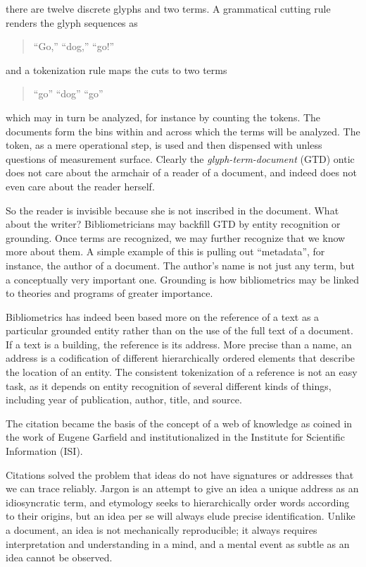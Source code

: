\documentclass[]{book}
\theoremstyle{definition}
\theoremstyle{definition}
\theoremstyle{definition}
\theoremstyle{remark}
\begin{document}
there are twelve discrete glyphs and two terms. A grammatical cutting
rule renders the glyph sequences as

\begin{quote}
``Go,'' ``dog,'' ``go!''
\end{quote}

and a tokenization rule maps the cuts to two terms

\begin{quote}
``go'' ``dog'' ``go''
\end{quote}

which may in turn be analyzed, for instance by counting the tokens. The
documents form the bins within and across which the terms will be
analyzed. The token, as a mere operational step, is used and then
dispensed with unless questions of measurement surface. Clearly the
\emph{glyph-term-document} (GTD) ontic does not care about the armchair
of a reader of a document, and indeed does not even care about the
reader herself.

So the reader is invisible because she is not inscribed in the document.
What about the writer? Bibliometricians may backfill GTD by entity
recognition or grounding. Once terms are recognized, we may further
recognize that we know more about them. A simple example of this is
pulling out ``metadata'', for instance, the author of a document. The
author's name is not just any term, but a conceptually very important
one. Grounding is how bibliometrics may be linked to theories and
programs of greater importance.

Bibliometrics has indeed been based more on the reference of a text as a
particular grounded entity rather than on the use of the full text of a
document. If a text is a building, the reference is its address. More
precise than a name, an address is a codification of different
hierarchically ordered elements that describe the location of an entity.
The consistent tokenization of a reference is not an easy task, as it
depends on entity recognition of several different kinds of things,
including year of publication, author, title, and source.

The citation became the basis of the concept of a web of knowledge as
coined in the work of Eugene Garfield and institutionalized in the
Institute for Scientific Information (ISI).

Citations solved the problem that ideas do not have signatures or
addresses that we can trace reliably. Jargon is an attempt to give an
idea a unique address as an idiosyncratic term, and etymology seeks to
hierarchically order words according to their origins, but an idea per
se will always elude precise identification. Unlike a document, an idea
is not mechanically reproducible; it always requires interpretation and
understanding in a mind, and a mental event as subtle as an idea cannot
be observed.
\end{document}
